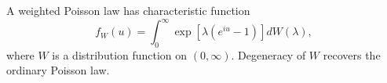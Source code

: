 A weighted Poisson law has characteristic function
$$f_W(u) = \int_0^\infty \exp\left[ \lambda(e^{iu} - 1) \right] dW(\lambda),$$
where $W$ is a distribution function on $(0, \infty)$. Degeneracy of $W$ recovers the ordinary Poisson law.

